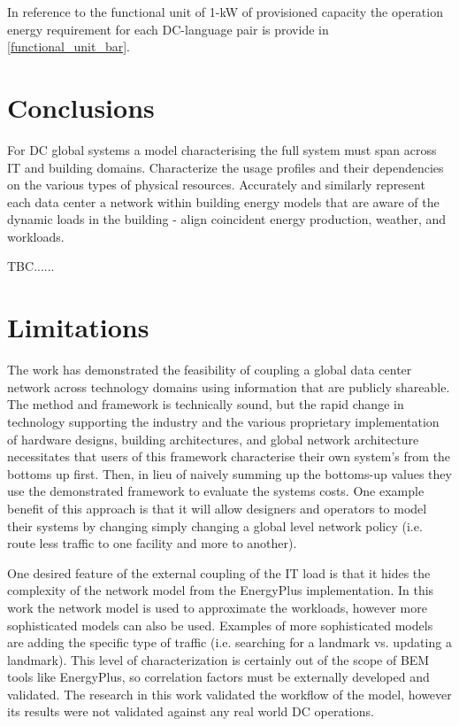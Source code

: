 In reference to the functional unit of 1-kW of provisioned capacity the operation energy requirement for each DC-language pair is provide in \ref{functional_unit_bar}.



\section{Conclusions}
For DC global systems a model characterising the full system must span across IT and building domains. Characterize the usage profiles and their dependencies on the various types of physical resources. Accurately and similarly represent each data center a network within building energy models that are aware of the dynamic loads in the building - align coincident energy production, weather, and workloads.

TBC......

\section{Limitations}
The work has demonstrated the feasibility of coupling a global data center network across technology domains using information that are publicly shareable. The method and framework is technically sound, but the rapid change in technology supporting the industry and the various proprietary implementation of hardware designs, building architectures, and global network architecture necessitates that users of this framework characterise their own system's from the bottoms up first. Then, in lieu of naively summing up the bottoms-up values they use the demonstrated framework to evaluate the systems costs. One example benefit of this approach is that it will allow designers and operators to model their systems by changing simply changing a global level network policy (i.e. route less traffic to one facility and more to another).

One desired feature of the external coupling of the IT load is that it hides the complexity of the network model from the EnergyPlus implementation. In this work the network model is used to approximate the workloads, however more sophisticated models can also be used. Examples of more sophisticated models are adding the specific type of traffic (i.e. searching for a landmark vs. updating a landmark). This level of characterization is certainly out of the scope of BEM tools like EnergyPlus, so correlation factors must be externally developed and validated. The research in this work validated the workflow of the model, however its results were not validated against any real world DC operations. 


